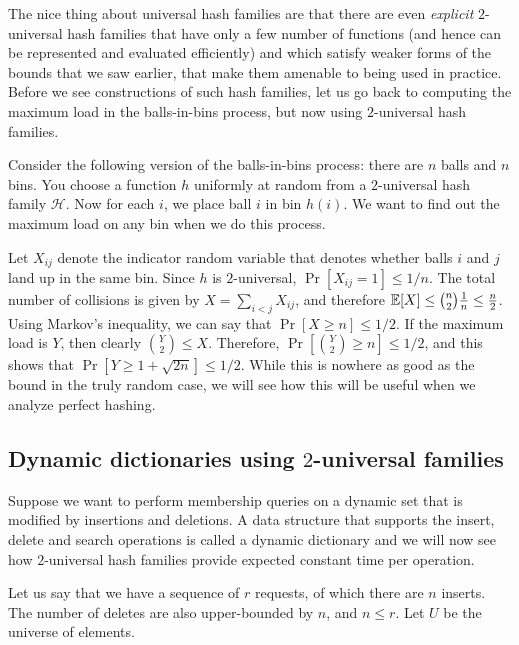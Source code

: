 The nice thing about universal hash families are that there are even
\emph{explicit} $2$-universal hash families that have only a few number of
functions (and hence can be represented and evaluated efficiently) and which
satisfy weaker forms of the bounds that we saw earlier, that make them amenable
to being used in practice. Before we see constructions of such hash families,
let us go back to computing the maximum load in the balls-in-bins process, but
now using $2$-universal hash families.

Consider the following version of the balls-in-bins process: there are $n$ balls
and $n$ bins. You choose a function $h$ uniformly at random from a $2$-universal
hash family $\mathcal{H}$. Now for each $i$, we place ball $i$ in bin $h(i)$. We
want to find out the maximum load on any bin when we do this process.

Let $X_{ij}$ denote the indicator random variable that denotes whether balls $i$
and $j$ land up in the same bin. Since $h$ is $2$-universal,
$\Pr[X_{ij}=1] \leq 1/n$. The total number of collisions is given by
$X = \sum_{i<j} X_{ij}$, and therefore
$\mathbb{E}[X] \leq \binom{n}{2}\frac{1}{n} \leq \frac{n}{2}$. Using Markov's
inequality, we can say that $\Pr[X \geq n] \leq 1/2$. If the maximum load is
$Y$, then clearly $\binom{Y}{2} \leq X$. Therefore,
$\Pr[\binom{Y}{2} \geq n] \leq 1/2$, and this shows that
$\Pr[Y \geq 1 + \sqrt{2n}] \leq 1/2$. While this is nowhere as good as the bound
in the truly random case, we will see how this will be useful when we analyze
perfect hashing.

\subsection{Dynamic dictionaries using $2$-universal families}

Suppose we want to perform membership queries on a dynamic set that is modified
by insertions and deletions. A data structure that supports the insert, delete
and search operations is called a dynamic dictionary and we will now see how
$2$-universal hash families provide expected constant time per operation.

Let us say that we have a sequence of $r$ requests, of which there are $n$
inserts. The number of deletes are also upper-bounded by $n$, and $n \leq
r$. Let $U$ be the universe of elements.

